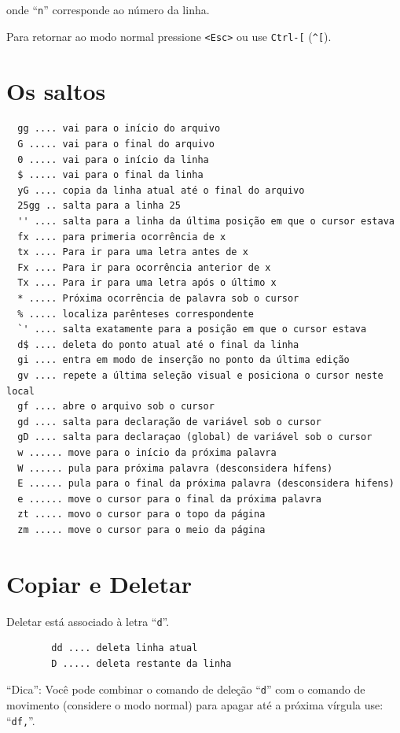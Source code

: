 \documentclass[10pt,a4paper,openany]{book}
\begin{document}
onde ``\verb|n|'' corresponde ao número da linha.

Para retornar ao modo normal pressione \verb|<Esc>| ou use \verb|Ctrl-[|
(\verb|^[|).

\section{Os saltos}\label{Os saltos}

\begin{verbatim}
  gg .... vai para o início do arquivo
  G ..... vai para o final do arquivo
  0 ..... vai para o início da linha
  $ ..... vai para o final da linha
  yG .... copia da linha atual até o final do arquivo
  25gg .. salta para a linha 25
  '' .... salta para a linha da última posição em que o cursor estava
  fx .... para primeria ocorrência de x
  tx .... Para ir para uma letra antes de x
  Fx .... Para ir para ocorrência anterior de x
  Tx .... Para ir para uma letra após o último x
  * ..... Próxima ocorrência de palavra sob o cursor
  % ..... localiza parênteses correspondente
  `' .... salta exatamente para a posição em que o cursor estava
  d$ .... deleta do ponto atual até o final da linha
  gi .... entra em modo de inserção no ponto da última edição
  gv .... repete a última seleção visual e posiciona o cursor neste local
  gf .... abre o arquivo sob o cursor
  gd .... salta para declaração de variável sob o cursor
  gD .... salta para declaraçao (global) de variável sob o cursor
  w ...... move para o início da próxima palavra
  W ...... pula para próxima palavra (desconsidera hífens)
  E ...... pula para o final da próxima palavra (desconsidera hifens)
  e ...... move o cursor para o final da próxima palavra
  zt ..... movo o cursor para o topo da página
  zm ..... move o cursor para o meio da página
\end{verbatim}

\section{Copiar e Deletar}\label{sec:Copiar e Deletar}

Deletar está associado à letra ``\verb|d|''.

\begin{verbatim}
		dd .... deleta linha atual
		D ..... deleta restante da linha
\end{verbatim}


``Dica'': Você pode combinar o comando de deleção ``\verb+d+'' com o
comando de movimento (considere o modo normal) para apagar até a
próxima vírgula use: ``\verb+df,+''. \\
\end{document}
